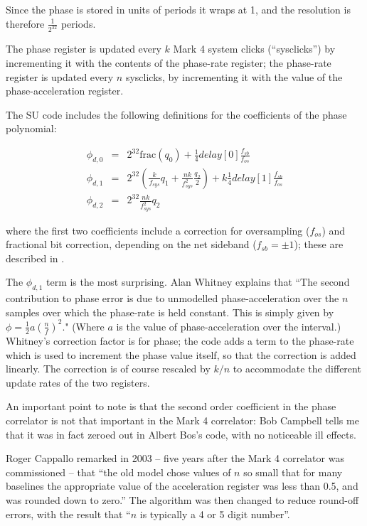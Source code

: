 \documentclass[a4paper]{article}
\begin{document}
Since the phase is stored in units of periods it wraps at 1, and the
resolution is therefore $\frac{1}{2^{32}}$ periods.

The phase register is updated every $k$ Mark 4 system clicks
(``sysclicks'') by incrementing it with the contents of the phase-rate
register; the phase-rate register is updated every $n$ sysclicks, by
incrementing it with the value of the phase-acceleration register.

The SU code includes the following definitions for the coefficients
of the phase polynomial:

\begin{eqnarray}
  \phi_{d, 0} &=& 2^{32} \textrm{frac}(q_0) + \frac{1}{4} delay[0] \frac{f_{sb}}{f_{os}} \\ 
  \phi_{d, 1}  &=& 2^{32} \left( \frac{k}{f_{sys}} q_1 + 
    \frac{n k}{f_{sys}^2} \frac{q_2}{2}\right) +   k \frac{1}{4} delay[1]  \frac{f_{sb}}{f_{os}}\\
  \phi_{d, 2} &=& 2^{32} \frac{n k}{f_{sys}^2} q_2 \label{eq:mk4d2phi}
\end{eqnarray}

where the first two coefficients include a correction for oversampling
($f_{os}$) and fractional bit correction, depending on the net
sideband ($f_{sb}=\pm 1$); these are described in \cite{mk4}.

The $\phi_{d, 1}$ term is the most surprising.  Alan Whitney
explains\cite{m101} that ``The second contribution to phase error is
due to unmodelled phase-acceleration over the $n$ samples over which
the phase-rate is held constant.  This is simply given by $\phi =
\frac{1}{2} a \left(\frac{n}{f}\right)^2$." (Where $a$ is the value of
phase-acceleration over the interval.)  Whitney's correction factor is
for phase; the code adds a term to the phase-rate which is used to
increment the phase value itself, so that the correction is added
linearly.  The correction is of course rescaled by $k/n$ to
accommodate the different update rates of the two registers.

An important point to note is that the second order coefficient in the
phase correlator is not that important in the Mark 4 correlator: Bob
Campbell tells me that it was in fact zeroed out in Albert Bos's code,
with no noticeable ill effects.  

Roger Cappallo \cite{mk4prob} remarked in 2003 -- five years after the
Mark 4 correlator was commissioned -- that ``the old model chose
values of $n$ so small that for many baselines the appropriate value
of the acceleration register was less than 0.5, and was rounded down
to zero.''  The algorithm was then changed to reduce round-off errors,
with the result that ``$n$ is typically a 4 or 5 digit number''.
\end{document}
